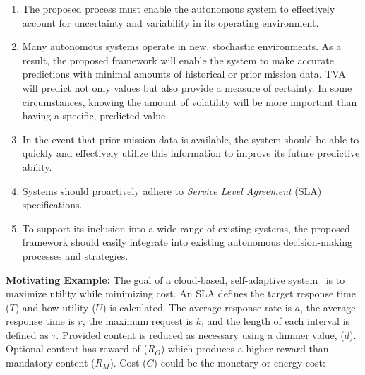 \documentclass[12pt]{article}
\begin{document}
\begin{enumerate}[noitemsep]

	\item The proposed process must enable the autonomous system to effectively account for uncertainty and variability in its operating environment. 

	\item Many autonomous systems operate in new, stochastic environments. As a result, the proposed framework will enable the system to make accurate predictions with minimal amounts of historical or prior mission data. TVA will predict not only values but also provide a measure of certainty. In some circumstances, knowing the amount of volatility will be more important than having a specific, predicted value.

	\item In the event that prior mission data is available, the system should be able to quickly and effectively utilize this information to improve its future predictive ability.



	\item Systems should proactively adhere to \emph{Service Level Agreement} (SLA) specifications.

	\item To support its inclusion into a wide range of existing systems, the proposed framework should easily integrate into existing autonomous decision-making processes and strategies.%

\end{enumerate}



\noindent\textbf{Motivating Example:} The goal of a cloud-based, self-adaptive system~\cite{moreno2017adaptation} is to maximize utility while minimizing cost. An SLA defines the target response time ($T$) and how utility ($U$) is calculated. %
The average response rate is $a$, the average response time is $r$, the maximum request is $k$, and the length of each interval is defined as $\tau$. Provided content is reduced as necessary using a dimmer value, ($d$). Optional content has reward of ($R_O$) which produces a higher reward than mandatory content ($R_M$). Cost ($C$) could be the monetary or energy cost:
\end{document}
